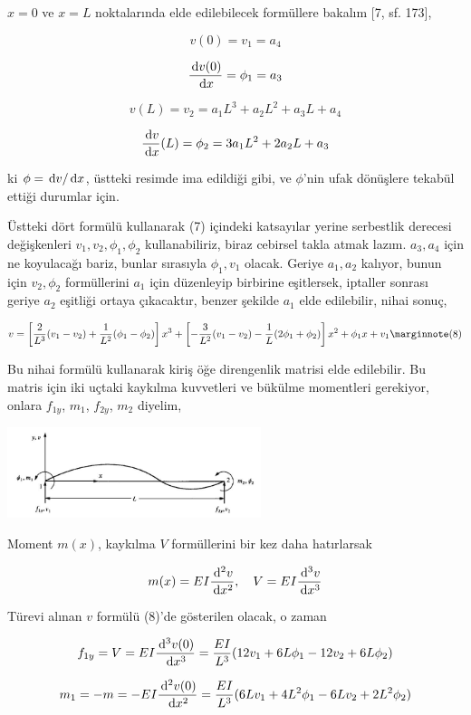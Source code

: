 \documentclass[12pt,fleqn]{article}\usepackage{../../common}
\begin{document}
$x=0$ ve $x=L$ noktalarında elde edilebilecek formüllere bakalım [7, sf. 173],

$$
v(0) = v_1 = a_4
$$

$$
\frac{\,\mathrm{d} v(0)}{\,\mathrm{d} x} = \phi_1 = a_3
$$

$$
v(L) = v_2 = a_1 L^3 + a_2 L^2 + a_3 L + a_4 
$$

$$
\frac{\,\mathrm{d} v}{\,\mathrm{d} x}(L) = \phi_2 = 3 a_1 L^2 + 2 a_2 L + a_3
$$

ki $\phi = \,\mathrm{d} v / \,\mathrm{d} x$, üstteki resimde ima edildiği gibi, ve $\phi$'nin
ufak dönüşlere tekabül ettiği durumlar için.

Üstteki dört formülü kullanarak (7) içindeki katsayılar yerine serbestlik
derecesi değişkenleri $v_1,v_2,\phi_1,\phi_2$ kullanabiliriz, biraz cebirsel
takla atmak lazım. $a_3,a_4$ için ne koyulacağı bariz, bunlar sırasıyla
$\phi_1,v_1$ olacak. Geriye $a_1,a_2$ kalıyor, bunun için $v_2,\phi_2$
formüllerini $a_1$ için düzenleyip birbirine eşitlersek, iptaller sonrası
geriye $a_2$ eşitliği ortaya çıkacaktır, benzer şekilde $a_1$ elde edilebilir,
nihai sonuç,

$$
v =
\left[
  \frac{2}{L^3} (v_1 - v_2) + \frac{1}{L^2} (\phi_1 - \phi_2) 
\right] x^3 +
\left[
  -\frac{3}{L^2} (v_1 - v_2) - \frac{1}{L} (2\phi_1 + \phi_2)
\right] x^2 +
\phi_1 x + v_1
\mlabel{8}
$$

Bu nihai formülü kullanarak kiriş öğe direngenlik matrisi elde
edilebilir. Bu matris için iki uçtaki kaykılma kuvvetleri ve
bükülme momentleri gerekiyor, onlara $f_{1y}$, $m_1$, $f_{2y}$,
$m_2$ diyelim,

\includegraphics[width=20em]{phy_020_strs_05_10.jpg}

Moment $m(x)$, kaykılma $V$ formüllerini bir kez daha hatırlarsak

$$
m(x) = EI \frac{\,\mathrm{d}^2 v}{\,\mathrm{d} x^2}, \quad
V = EI \frac{\,\mathrm{d}^3 v}{\,\mathrm{d} x^3}
$$

Türevi alınan $v$ formülü (8)'de gösterilen olacak, o zaman

$$
f_{1y} = V = EI \frac{\,\mathrm{d}^3 v(0)}{\,\mathrm{d} x^3} =
\frac{EI}{L^3} (12 v_1 + 6L \phi_1 - 12 v_2 + 6L \phi_2 )
$$

$$
m_1 = -m = -EI \frac{\,\mathrm{d}^2 v(0)}{\,\mathrm{d} x^2} =
\frac{EI}{L^3} ( 6L v_1 + 4L^2 \phi_1 - 6L v_2 + 2 L^2 \phi_2 )
$$
\end{document}
